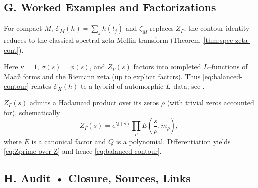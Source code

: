 
\subsection*{G. Worked Examples and Factorizations}
\label{subsec:examples-zeta}

\begin{example}
For compact $M$, $\mathcal E_M(h)=\sum_j h(t_j)$ and $\zeta_M$ replaces $Z_\Gamma$; the contour identity reduces to the classical spectral zeta Mellin transform (Theorem~\ref{thm:spec-zeta-cont}).
\end{example}

\begin{example}[Modular surface $X=\mathrm{PSL}_2(\mathbb Z)\backslash\mathbb H$]
Here $\kappa=1$, $\sigma(s)=\phi(s)$, and $Z_\Gamma(s)$ factors into completed $L$–functions of Maaß forms and the Riemann zeta (up to explicit factors). Thus \eqref{eq:balanced-contour} relates $\mathcal E_X(h)$ to a hybrid of automorphic $L$–data; see \cite{Iwaniec2002,Hejhal1983}.
\end{example}

\begin{example}
$Z_\Gamma(s)$ admits a Hadamard product over its zeros $\rho$ (with trivial zeros accounted for), schematically
\[
  Z_\Gamma(s) = e^{Q(s)} \prod_\rho E\!\left(\frac{s}{\rho}, m_\rho\right),
\]
where $E$ is a canonical factor and $Q$ is a polynomial. Differentiation yields \eqref{eq:Zprime-over-Z} and hence \eqref{eq:balanced-contour}.
\end{example}


\subsection*{H. Audit • Closure, Sources, Links}
\label{subsec:audit-analytic}

